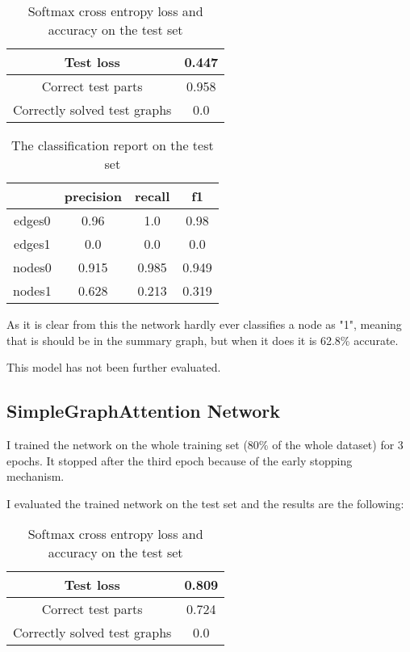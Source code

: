 \begin{table}[!h]
	\centering
	\begin{tabular}{| c | c |}
		\hline
		Test loss & 0.447 \\ \hline
		Correct test parts & 0.958 \\ \hline
		Correctly solved test graphs & 0.0 \\ \hline
	\end{tabular}
	\caption{Softmax cross entropy loss and accuracy on the test set}
\end{table}

\begin{table}[!h]
	\centering
	\begin{tabular}{| c | c | c | c |}
		\hline
		 & precision & recall & f1 \\ \hline \hline
		edges0&0.96&1.0&0.98  \\ \hline
		edges1 & 0.0 & 0.0 & 0.0 \\ \hline
		nodes0 & 0.915 & 0.985 & 0.949 \\ \hline
		nodes1 & 0.628 & 0.213 & 0.319 \\ \hline
	\end{tabular}
	\caption{The classification report on the test set}
\end{table}

As it is clear from this the network hardly ever classifies a node as "1", meaning that is should be in the summary graph, but when it does it is 62.8\% accurate.

This model has not been further evaluated.

\subsection{SimpleGraphAttention Network}
I trained the network on the whole training set (80\% of the whole dataset) for 3 epochs. It stopped after the third epoch because of the early stopping mechanism.

I evaluated the trained network on the test set and the results are the following:

\begin{table}[!h]
	\centering
	\begin{tabular}{| c | c |}
		\hline
		Test loss & 0.809 \\ \hline
		Correct test parts & 0.724 \\ \hline
		Correctly solved test graphs & 0.0 \\ \hline
	\end{tabular}
	\caption{Softmax cross entropy loss and accuracy on the test set}
\end{table}

